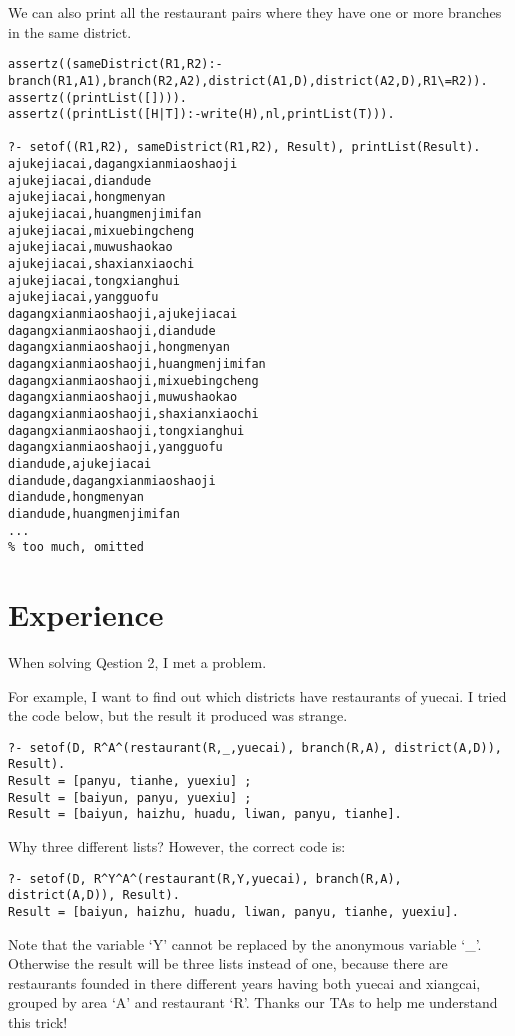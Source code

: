 ﻿\documentclass[a4paper, 11pt]{article}
\begin{document}
We can also print all the restaurant pairs where they have one or more branches in the same district.
\begin{lstlisting}
assertz((sameDistrict(R1,R2):-branch(R1,A1),branch(R2,A2),district(A1,D),district(A2,D),R1\=R2)).
assertz((printList([]))).
assertz((printList([H|T]):-write(H),nl,printList(T))).

?- setof((R1,R2), sameDistrict(R1,R2), Result), printList(Result).
ajukejiacai,dagangxianmiaoshaoji
ajukejiacai,diandude
ajukejiacai,hongmenyan
ajukejiacai,huangmenjimifan
ajukejiacai,mixuebingcheng
ajukejiacai,muwushaokao
ajukejiacai,shaxianxiaochi
ajukejiacai,tongxianghui
ajukejiacai,yangguofu
dagangxianmiaoshaoji,ajukejiacai
dagangxianmiaoshaoji,diandude
dagangxianmiaoshaoji,hongmenyan
dagangxianmiaoshaoji,huangmenjimifan
dagangxianmiaoshaoji,mixuebingcheng
dagangxianmiaoshaoji,muwushaokao
dagangxianmiaoshaoji,shaxianxiaochi
dagangxianmiaoshaoji,tongxianghui
dagangxianmiaoshaoji,yangguofu
diandude,ajukejiacai
diandude,dagangxianmiaoshaoji
diandude,hongmenyan
diandude,huangmenjimifan
...
% too much, omitted
\end{lstlisting}

\section{Experience}
When solving Qestion 2, I met a problem.

For example, I want to find out which districts have restaurants of yuecai. I tried the code below, but the result it produced was strange.
\begin{lstlisting}
?- setof(D, R^A^(restaurant(R,_,yuecai), branch(R,A), district(A,D)), Result).
Result = [panyu, tianhe, yuexiu] ;
Result = [baiyun, panyu, yuexiu] ;
Result = [baiyun, haizhu, huadu, liwan, panyu, tianhe].
\end{lstlisting}

Why three different lists? However, the correct code is:
\begin{lstlisting}
?- setof(D, R^Y^A^(restaurant(R,Y,yuecai), branch(R,A), district(A,D)), Result).
Result = [baiyun, haizhu, huadu, liwan, panyu, tianhe, yuexiu].
\end{lstlisting}
Note that the variable `Y' cannot be replaced by the anonymous variable `\_'. Otherwise the result will be three lists instead of one, because there are restaurants founded in there different years having both yuecai and xiangcai, grouped by area `A' and restaurant `R'. Thanks our TAs to help me understand this trick!

%
%
\end{document}
